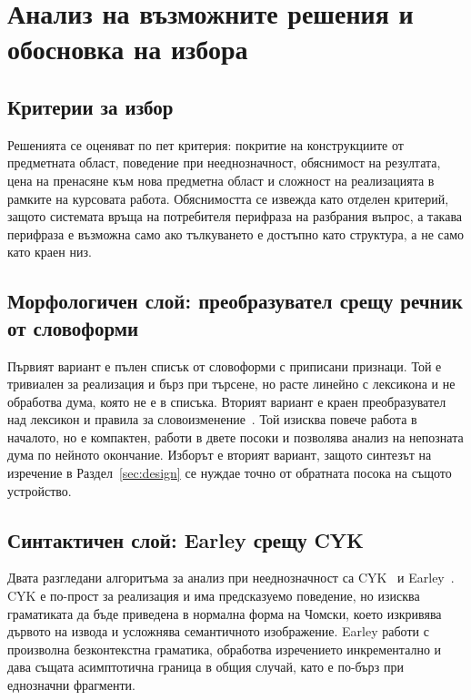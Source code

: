 \section{Анализ на възможните решения и обосновка на избора}
\label{sec:alternatives}

\subsection{Критерии за избор}

Решенията се оценяват по пет критерия: покритие на конструкциите от предметната
област, поведение при нееднозначност, обяснимост на резултата, цена на пренасяне към
нова предметна област и сложност на реализацията в рамките на курсовата работа.
Обяснимостта се извежда като отделен критерий, защото системата връща на потребителя
перифраза на разбрания въпрос, а такава перифраза е възможна само ако тълкуването е
достъпно като структура, а не само като краен низ.

\subsection{Морфологичен слой: преобразувател срещу речник от словоформи}

Първият вариант е пълен списък от словоформи с приписани признаци. Той е тривиален за
реализация и бърз при търсене, но расте линейно с лексикона и не обработва дума, която
не е в списъка. Вторият вариант е краен преобразувател над лексикон и правила за
словоизменение~\cite{beesley2003fsmorphology}. Той изисква повече работа в началото,
но е компактен, работи в двете посоки и позволява анализ на непозната дума по нейното
окончание. Изборът е вторият вариант, защото синтезът на изречение в
Раздел~\ref{sec:design} се нуждае точно от обратната посока на същото устройство.

\subsection{Синтактичен слой: Earley срещу CYK}

Двата разгледани алгоритъма за анализ при нееднозначност са
CYK~\cite{younger1967cyk} и Earley~\cite{earley1970parsing}. CYK е по-прост за
реализация и има предсказуемо поведение, но изисква граматиката да бъде приведена в
нормална форма на Чомски, което изкривява дървото на извода и усложнява семантичното
изображение. Earley работи с произволна безконтекстна граматика, обработва изречението
инкрементално и дава същата асимптотична граница в общия случай, като е по-бърз при
еднозначни фрагменти.


